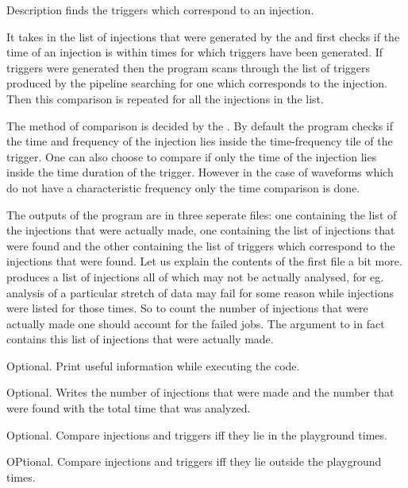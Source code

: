 \begin{entry}
\item[Description] 
 finds the triggers which correspond to an injection.


It takes in the list of injections that were generated by the  
and first checks if the time of an injection is within times
for which triggers have been generated.  If triggers were generated then the program 
scans through the list of triggers produced by the pipeline searching for one
which corresponds to the injection.  Then this comparison is repeated for all the 
injections in the list.

The method of comparison is decided by the .  By default
the program checks if the time and frequency of the injection lies inside the 
time-frequency tile of the trigger.  One can also choose to compare if only the
time of the injection lies inside the time duration of the trigger.  However in the
case of waveforms which do not have a characteristic frequency only the time comparison 
is done.
 
The outputs of the program are in three seperate files: one containing the list of the 
injections that were actually made,  one containing the list of injections that were found
and the other containing the list of triggers which correspond to the injections that were 
found.  Let us explain the contents of the first file a bit more.  
produces a list of injections all of which may not be actually analysed,  for eg.
analysis of a particular stretch of data may fail for some reason while injections were 
listed for those times.  So to count the number of injections that were actually made
one should account for the failed jobs.  The argument to  in
fact contains this list of injections that were actually made.
   

\item[\option{--verbose}]
Optional.  Print useful information while executing the code.

\item[\option{--printresult}]
Optional.  Writes the number of injections that were made and the number that were found with
the total time that was analyzed.

\item[\option{--playground}]
Optional.  Compare injections and triggers iff they lie in the playground times.

\item[\option{--noplayground}]
OPtional.  Compare injections and triggers iff they lie outside the playground times. 


\end{entry}
